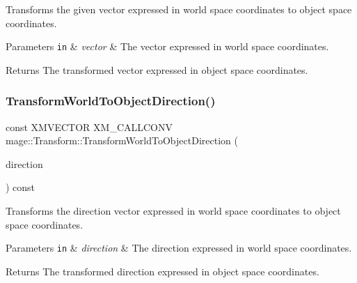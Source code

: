 Transforms the given vector expressed in world space coordinates to object space coordinates.


\begin{DoxyParams}[1]{Parameters}
\mbox{\tt in}  & {\em vector} & The vector expressed in world space coordinates. \\
\hline
\end{DoxyParams}
\begin{DoxyReturn}{Returns}
The transformed vector expressed in object space coordinates. 
\end{DoxyReturn}
\hypertarget{classmage_1_1_transform_a5f7294e796fa370e44c6ca055638ffde}{}\label{classmage_1_1_transform_a5f7294e796fa370e44c6ca055638ffde} 
\subsubsection{\texorpdfstring{Transform\+World\+To\+Object\+Direction()}{TransformWorldToObjectDirection()}}
{\footnotesize\ttfamily const X\+M\+V\+E\+C\+T\+OR X\+M\+\_\+\+C\+A\+L\+L\+C\+O\+NV mage\+::\+Transform\+::\+Transform\+World\+To\+Object\+Direction (\begin{DoxyParamCaption}\item[{F\+X\+M\+V\+E\+C\+T\+OR}]{direction }\end{DoxyParamCaption}) const\hspace{0.3cm}{\ttfamily [noexcept]}}

Transforms the direction vector expressed in world space coordinates to object space coordinates.


\begin{DoxyParams}[1]{Parameters}
\mbox{\tt in}  & {\em direction} & The direction expressed in world space coordinates. \\
\hline
\end{DoxyParams}
\begin{DoxyReturn}{Returns}
The transformed direction expressed in object space coordinates. 
\end{DoxyReturn}
\hypertarget{classmage_1_1_transform_af4d6c69cbf207632ded7c33446c5ee91}{}\label{classmage_1_1_transform_af4d6c69cbf207632ded7c33446c5ee91} 
